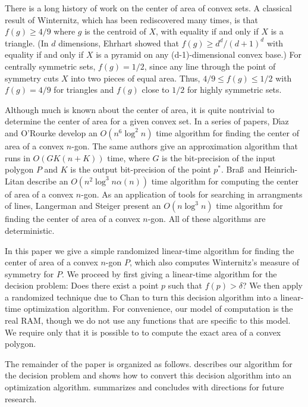 \documentclass{ws-ijcga}
\begin{document}
There is a long history of work on the center of area of convex sets.
A classical result of Winternitz,\cite[pp.~54--55]{b23} which has
been rediscovered many times,\cite{e55b,ll35,n45,n58,yb51} is
that $f(g)\ge 4/9$ where $g$ is the centroid of $X$, with equality if
and only if $X$ is a triangle. (In $d$ dimensions, Ehrhart\cite{e55a} showed
that $f(g)\ge d^d/(d+1)^d$ with equality if and only if $X$ is a
pyramid on any (d-1)-dimensional convex base.)  For centrally
symmetric sets, $f(g)=1/2$, since any line through the point of
symmetry cuts $X$ into two pieces of equal area.  Thus, $4/9\le
f(g)\le 1/2$ with $f(g)=4/9$ for triangles and $f(g)$ close to $1/2$
for highly symmetric sets.

Although much is known about the center of area, it is quite
nontrivial to determine the center of area for a given convex set.  In
a series of papers, D\'{\i}az and O'Rourke\cite{do89,do91,do94} develop
an $O(n^6\log^2 n)$ time algorithm for finding the center of area of a
convex $n$-gon.  The same authors give an approximation algorithm that
runs in $O(GK(n+K))$ time, where $G$ is the bit-precision of the input
polygon $P$ and $K$ is the output bit-precision of the point $p^*$.
Bra\ss\ and Heinrich-Litan\cite{bh02} describe an $O(n^2\log^3
n\alpha(n))$ time algorithm for computing the center of area of a
convex $n$-gon.  As an application of tools for searching in
arrangments of lines, Langerman and Steiger\cite{ls02} present an
$O(n\log^3 n)$ time algorithm for finding the center of area of a
convex $n$-gon.  All of these algorithms are deterministic.

In this paper we give a simple randomized linear-time algorithm for
finding the center of area of a convex $n$-gon $P$, which also
computes Winternitz's measure of symmetry for $P$.  We proceed by first
giving a linear-time algorithm for the decision problem: Does there
exist a point $p$ such that $f(p)>\delta$?  We then apply a randomized
technique due to Chan\cite{c99} to turn this decision algorithm into a
linear-time optimization algorithm.  For convenience, our model of
computation is the real RAM,\cite{ps85} though we do not use any functions that
are specific to this model.  We require only that it is possible to
to compute the exact area of a convex polygon.

The remainder of the paper is organized as follows.  
describes our algorithm for the decision problem and
 shows how to convert this decision algorithm
into an optimization algorithm.   summarizes and
concludes with directions for future research.
\end{document}
